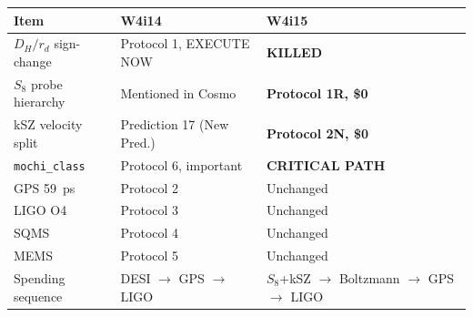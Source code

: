 \documentclass[11pt]{article}
\begin{document}
\begin{center}
\renewcommand{\arraystretch}{1.2}
\begin{tabular}{@{}lll@{}}
\toprule
\textbf{Item} & \textbf{W4i14} & \textbf{W4i15} \\
\midrule
$D_H/r_d$ sign-change & Protocol 1, EXECUTE NOW & \textbf{KILLED} \\
$S_8$ probe hierarchy & Mentioned in Cosmo & \textbf{Protocol 1R, \$0} \\
kSZ velocity split & Prediction 17 (New Pred.) & \textbf{Protocol 2N, \$0} \\
\texttt{mochi\_class} & Protocol 6, important & \textbf{CRITICAL PATH} \\
GPS 59~ps & Protocol 2 & Unchanged \\
LIGO O4 & Protocol 3 & Unchanged \\
SQMS & Protocol 4 & Unchanged \\
MEMS & Protocol 5 & Unchanged \\
Spending sequence & DESI $\to$ GPS $\to$ LIGO & $S_8$+kSZ $\to$ Boltzmann
  $\to$ GPS $\to$ LIGO \\
\bottomrule
\end{tabular}
\end{center}
\end{document}
